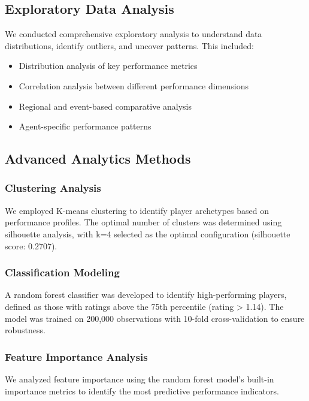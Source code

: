\documentclass[11pt,a4paper]{article}
\begin{document}
\subsection{Exploratory Data Analysis}

We conducted comprehensive exploratory analysis to understand data distributions, identify outliers, and uncover patterns. This included:

\begin{itemize}
\item Distribution analysis of key performance metrics
\item Correlation analysis between different performance dimensions
\item Regional and event-based comparative analysis
\item Agent-specific performance patterns
\end{itemize}

\subsection{Advanced Analytics Methods}

\subsubsection{Clustering Analysis}

We employed K-means clustering to identify player archetypes based on performance profiles. The optimal number of clusters was determined using silhouette analysis, with k=4 selected as the optimal configuration (silhouette score: 0.2707).

\subsubsection{Classification Modeling}

A random forest classifier was developed to identify high-performing players, defined as those with ratings above the 75th percentile (rating > 1.14). The model was trained on 200,000 observations with 10-fold cross-validation to ensure robustness.

\subsubsection{Feature Importance Analysis}

We analyzed feature importance using the random forest model's built-in importance metrics to identify the most predictive performance indicators.
\end{document}
